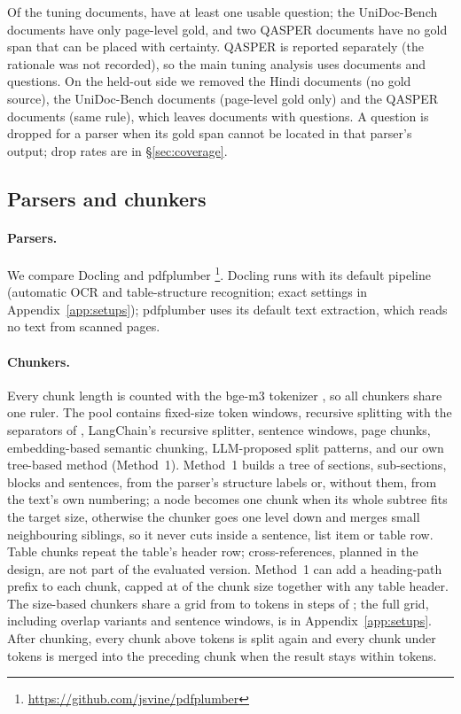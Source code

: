 Of the \TuningDocuments{} tuning documents,
\TuningScoredDocuments{} have at least one usable question;
the UniDoc-Bench documents have only page-level gold, and two QASPER
documents have no gold span that can be placed with certainty. QASPER
is reported separately (the rationale was not recorded), so
the main tuning analysis uses \TuningMainDocuments{} documents and
\TuningMainQuestions{} questions.
On the held-out side we removed the
\AccountingRemovedOwnHindiTrack{} Hindi documents (no gold source), the
\AccountingRemovedUniDocBench{} UniDoc-Bench documents (page-level gold
only) and the \AccountingRemovedQASPER{} QASPER documents (same rule),
which leaves \AccountingMain{} documents with \RQoneQuestions{}
questions. A question is dropped for a parser when its gold span cannot
be located in that parser's output; drop rates are in
\S\ref{sec:coverage}.

\subsection{Parsers and chunkers}
\label{sec:setups}

\paragraph{Parsers.} We compare Docling \DoclingVersion{}
\citep{auer2024docling} and pdfplumber \PdfplumberVersion{}\footnote{\url{https://github.com/jsvine/pdfplumber}}. Docling runs with its default pipeline (automatic OCR and
table-structure recognition; exact settings in Appendix~\ref{app:setups}); pdfplumber uses its default
text extraction, which reads no text from scanned pages.

\paragraph{Chunkers.} Every chunk length is counted with the bge-m3
tokenizer \citep{chen2024m3}, so all chunkers share one ruler. The pool contains fixed-size
token windows, recursive splitting with the separators of
\citet{demourajunior2026adaptive}, LangChain's recursive splitter,
sentence windows, page chunks, embedding-based semantic chunking,
LLM-proposed split patterns, and our own tree-based method
(Method~1). Method~1 builds a tree of sections, sub-sections, blocks and
sentences, from the parser's structure labels or, without them, from the
text's own numbering; a node becomes one chunk when its whole subtree
fits the target size, otherwise the chunker goes one level down and
merges small neighbouring siblings, so it never cuts inside a sentence,
list item or table row. Table chunks repeat the table's header row;
cross-references, planned in the design, are not part of the evaluated
version. Method~1 can add a
heading-path prefix to each chunk, capped at \PrefixCap{} of the chunk
size together with any table header. The size-based chunkers share a grid from
\SizeMin{} to \SizeMax{} tokens in steps of \SizeStep{}; the full grid, including overlap variants
and sentence windows, is in Appendix~\ref{app:setups}. After
chunking, every chunk above \ChunkMax{} tokens is split again and every
chunk under \ChunkMin{} tokens is merged into the preceding chunk when the result
stays within \ChunkMax{} tokens.

